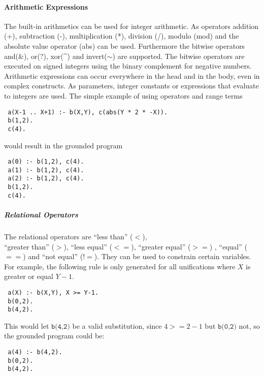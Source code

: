 \documentclass[a4paper,10pt]{article}
\begin{document}
\paragraph{Arithmetic Expressions}
The built-in arithmetics can be used for integer arithmetic.
As operators addition (+), subtraction (-), multiplication (*), division (/), modulo (mod) and the absolute value operator (abs) can be used.
Furthermore the bitwise operators and(\&), or(?), xor(\textasciicircum) and invert($\sim$) are supported. The bitwise operators are executed on signed integers using the binary complement for negative numbers.
Arithmetic expressions can occur everywhere in the head and in the body, even in complex constructs.
As parameters, integer constants or expressions that evaluate to integers are used.
The simple example of using operators and range terms
\begin{verbatim}
 a(X-1 .. X+1) :- b(X,Y), c(abs(Y * 2 * -X)).
 b(1,2).
 c(4).
\end{verbatim}
would result in the grounded program
\begin{verbatim}
 a(0) :- b(1,2), c(4).
 a(1) :- b(1,2), c(4).
 a(2) :- b(1,2), c(4).
 b(1,2).
 c(4).
\end{verbatim}

\subparagraph{Relational Operators}
The relational operators are ``less than'' ($<$),\\ ``greater than'' ($>$), ``less equal'' ($<=$), ``greater equal'' ($>=$) , ``equal'' ($==$) and ``not equal'' ($!=$).
They can be used to constrain certain variables.
For example, the following rule is only generated for all unifications where $X$ is greater or equal $Y-1$.
\begin{verbatim}
 a(X) :- b(X,Y), X >= Y-1.
 b(0,2).
 b(4,2).
\end{verbatim}
This would let $\texttt{b(4,2)}$ be a valid substitution, since $4 >= 2-1$ but $\texttt{b(0,2)}$ not, so the grounded program could be:
\begin{verbatim}
 a(4) :- b(4,2).
 b(0,2).
 b(4,2).
\end{verbatim}
\end{document}
